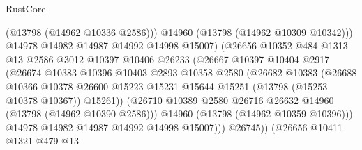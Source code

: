 \begin{lexlean}{RustCore}
\begin{coremodule}
                                  (@13798 (@14962 @10336 @2586)))
                                @14960
                                (@13798 (@14962 @10309 @10342)))
                              @14978
                              @14982
                              @14987
                              @14992
                              @14998
                              @15007)
                            (@26656
                              @10352
                              @484
                              @1313
                              @13
                              @2586
                              @3012
                              @10397
                              @10406
                              @26233
                              (@26667
                                @10397
                                @10404
                                @2917
                                (@26674
                                  @10383
                                  @10396
                                  @10403
                                  @2893
                                  @10358
                                  @2580
                                  (@26682
                                    @10383
                                    (@26688
                                      @10366
                                      @10378
                                      @26600
                                      @15223
                                      @15231
                                      @15644
                                      @15251
                                      (@13798 (@15253 @10378 @10367))
                                      @15261))
                                  (@26710
                                    @10389
                                    @2580
                                    @26716
                                    @26632
                                    @14960
                                    (@13798 (@14962 @10390 @2586)))
                                  @14960
                                  (@13798 (@14962 @10359 @10396)))
                                @14978
                                @14982
                                @14987
                                @14992
                                @14998
                                @15007)))
                          @26745))
                      (@26656
                        @10411
                        @1321
                        @479
                        @13

\end{coremodule}
\end{lexlean}
